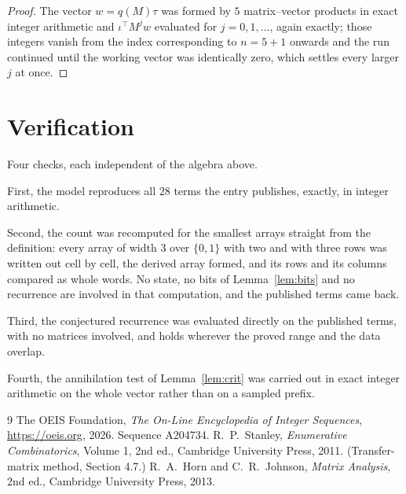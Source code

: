 \documentclass[11pt,a4paper]{article}
\theoremstyle{plain}
\theoremstyle{definition}
\begin{document}
\begin{proof}
The vector $w=q(M)\tau$ was formed by $5$ matrix--vector products in exact integer
arithmetic and $\iota^{\!\top}M^{j}w$ evaluated for $j=0,1,\dots$, again exactly; those
integers vanish from the index corresponding to $n=5+1$ onwards and the run continued
until the working vector was identically zero, which settles every larger $j$ at once.
\end{proof}

\section{Verification}

Four checks, each independent of the algebra above.

First, the model reproduces all $28$ terms the entry publishes, exactly, in integer
arithmetic.

Second, the count was recomputed for the smallest arrays straight from the definition: every
array of width $3$ over $\{0,1\}$ with two and with three rows was written out cell by cell,
the derived array formed, and its rows and its columns compared as whole words. No state, no
bits of Lemma~\ref{lem:bits} and no recurrence are involved in that computation, and the
published terms came back.

Third, the conjectured recurrence was evaluated directly on the published terms, with no
matrices involved, and holds wherever the proved range and the data overlap.

Fourth, the annihilation test of Lemma~\ref{lem:crit} was carried out in exact integer
arithmetic on the whole vector rather than on a sampled prefix.

\begin{thebibliography}{9}
 The OEIS Foundation, \emph{The On-Line Encyclopedia of Integer
Sequences}, \url{https://oeis.org}, 2026. Sequence A204734.
 R.~P.~Stanley, \emph{Enumerative Combinatorics}, Volume 1, 2nd ed.,
Cambridge University Press, 2011. (Transfer-matrix method, Section 4.7.)
 R.~A.~Horn and C.~R.~Johnson, \emph{Matrix Analysis}, 2nd ed., Cambridge
University Press, 2013.
\end{thebibliography}
\end{document}
